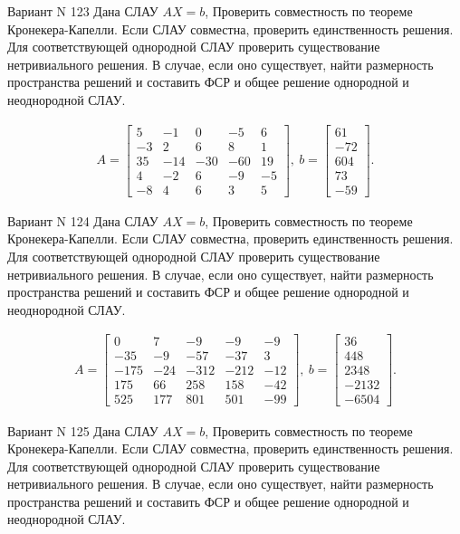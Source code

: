 \documentclass[11pt]{report}
\begin{document}
Вариант N 123
Дана СЛАУ $AX = b$,
Проверить совместность по теореме Кронекера-Капелли. Если СЛАУ совместна, проверить единственность решения.
Для соответствующей однородной СЛАУ проверить существование нетривиального решения. В случае, если оно существует,
найти размерность пространства решений и составить ФСР и общее решение однородной  и неоднородной СЛАУ.


\begin{align*}
 A = \left[\begin{matrix}5 & -1 & 0 & -5 & 6\\-3 & 2 & 6 & 8 & 1\\35 & -14 & -30 & -60 & 19\\4 & -2 & 6 & -9 & -5\\-8 & 4 & 6 & 3 & 5\end{matrix}\right],
\ b = \left[\begin{matrix}61\\-72\\604\\73\\-59\end{matrix}\right]. 
 \end{align*}

Вариант N 124
Дана СЛАУ $AX = b$,
Проверить совместность по теореме Кронекера-Капелли. Если СЛАУ совместна, проверить единственность решения.
Для соответствующей однородной СЛАУ проверить существование нетривиального решения. В случае, если оно существует,
найти размерность пространства решений и составить ФСР и общее решение однородной  и неоднородной СЛАУ.


\begin{align*}
 A = \left[\begin{matrix}0 & 7 & -9 & -9 & -9\\-35 & -9 & -57 & -37 & 3\\-175 & -24 & -312 & -212 & -12\\175 & 66 & 258 & 158 & -42\\525 & 177 & 801 & 501 & -99\end{matrix}\right],
\ b = \left[\begin{matrix}36\\448\\2348\\-2132\\-6504\end{matrix}\right]. 
 \end{align*}

Вариант N 125
Дана СЛАУ $AX = b$,
Проверить совместность по теореме Кронекера-Капелли. Если СЛАУ совместна, проверить единственность решения.
Для соответствующей однородной СЛАУ проверить существование нетривиального решения. В случае, если оно существует,
найти размерность пространства решений и составить ФСР и общее решение однородной  и неоднородной СЛАУ.
\end{document}
